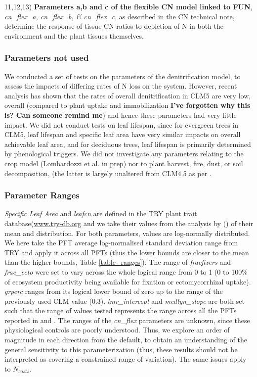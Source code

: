 \documentclass[draft,linenumbers]{agujournal}
\begin{document}
11,12,13) \textbf{Parameters a,b and c of the flexible CN model linked to FUN}, \emph{cn\_flex\_a, cn\_flex\_b, \& cn\_flex\_c}, as described in the CN technical note, determine the response of tissue CN ratios to depletion of N in both the environment and the plant tissues themselves.


\subsubsection{Parameters not used}

We conducted a set of tests on the parameters of the denitrification model, to assess the impacts of differing rates of N loss on the system. However, recent analysis has shown that the rates of overall denitrification in CLM5 are very low, overall (compared to plant uptake and immobilization \textbf{I've forgotten why this is? Can someone remind me}) and hence these parameters had very little impact. We did not conduct tests on leaf lifespan, since for evergreen trees in CLM5, leaf lifespan and specific leaf area have very similar impacts on overall achievable leaf area, and for deciduous trees, leaf lifespan is primarily determined by phenological triggers. We did not investigate any parameters relating to the crop model (Lombardozzi et al. in prep) nor to plant harvest, fire, dust, or soil decomposition, (the latter is largely unaltered from CLM4.5 as per \cite{koven2013}.

\subsubsection{Parameter Ranges}

\emph{Specific Leaf Area} and \emph{leafcn} are defined in the TRY plant trait database(\url{www.try-db.org} and we take their values from the analysis by (\cite{kattge2011}) of their mean and distribution. For both parameters, values are log-normally distributed. We here take the PFT average log-normalised standard deviation range from TRY and apply it across all PFTs (thus the lower bounds are closer to the mean than the higher bounds, Table \ref{table_ranges}). The range of \emph{fracfixers} and \emph{frac\_ecto} were set to vary across the whole logical range from 0 to 1 (0 to 100\% of ecosystem productivity being available for fixation or ectomycorrhizal uptake). \emph{grperc} ranges from its logical lower bound of zero up to the range of the previously used CLM value (0.3). \emph{lmr\_intercept} and \emph{medlyn\_slope} are both set such that the range of values tested represents the range across all the PFTs reported in \cite{atkin2015} and \cite{dekauwe2015}. The ranges of the \emph{cn\_flex} parameters are unknown, since these physiological controls are poorly understood. Thus, we explore an order of magnitude in each direction from the default, to obtain an understanding of the general sensitivity to this parameterization (thus, these results should not be interpreted as covering a constrained range of variation). The same issues apply to $N_{costs}$.
\end{document}
